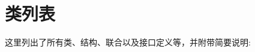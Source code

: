 \section{类列表}
这里列出了所有类、结构、联合以及接口定义等，并附带简要说明\+:\begin{DoxyCompactList}
\item{}
\end{DoxyCompactList}
